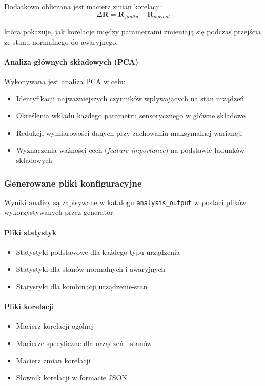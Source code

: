 Dodatkowo obliczana jest macierz zmian korelacji:
$$\Delta\mathbf{R} = \mathbf{R}_{faulty} - \mathbf{R}_{normal}$$

która pokazuje, jak korelacje między parametrami zmieniają się podczas przejścia ze stanu normalnego do awaryjnego.

\paragraph{Analiza głównych składowych (PCA)}
Wykonywana jest analiza PCA w celu:
\begin{itemize}
    \item Identyfikacji najważniejszych czynników wpływających na stan urządzeń
    \item Określenia wkładu każdego parametru sensorycznego w główne składowe
    \item Redukcji wymiarowości danych przy zachowaniu maksymalnej wariancji
    \item Wyznaczenia ważności cech (\textit{feature importance}) na podstawie ładunków składowych
\end{itemize}

\subsubsection{Generowane pliki konfiguracyjne}

Wyniki analizy są zapisywane w katalogu \texttt{analysis\_output} w postaci plików wykorzystywanych przez generator:

\paragraph{Pliki statystyk}
\begin{itemize}
    \item Statystyki podstawowe dla każdego typu urządzenia
    \item Statystyki dla stanów normalnych i awaryjnych
    \item Statystyki dla kombinacji urządzenie-stan
\end{itemize}

\paragraph{Pliki korelacji}
\begin{itemize}
    \item Macierz korelacji ogólnej
    \item Macierze specyficzne dla urządzeń i stanów
    \item Macierz zmian korelacji
    \item Słownik korelacji w formacie JSON
\end{itemize}

